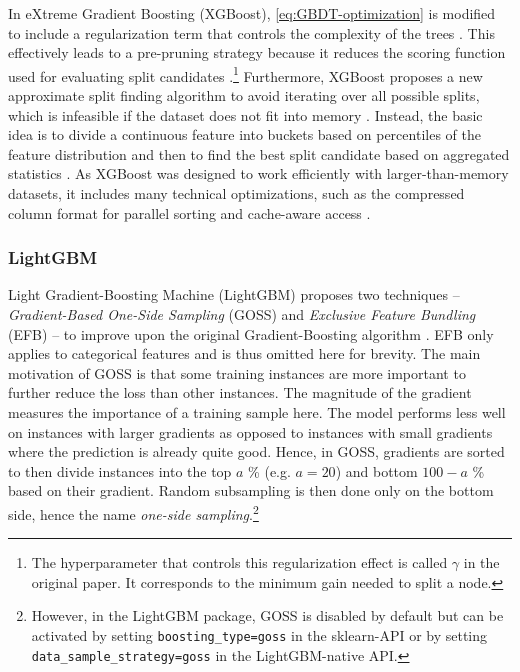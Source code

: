 In eXtreme Gradient Boosting (XGBoost), \cref{eq:GBDT-optimization} is modified to include a regularization term that controls the complexity of the trees \parencite[2]{chen_xgboost_2016}. This effectively leads to a pre-pruning strategy because it reduces the scoring function used for evaluating split candidates \parencites[1941--1942]{bentejac_comparative_2021}.\footnote{The hyperparameter that controls this regularization effect is called $\gamma$ in the original paper. It corresponds to the minimum gain needed to split a node.}
Furthermore, XGBoost proposes a new approximate split finding algorithm to avoid iterating over all possible splits, which is infeasible if the dataset does not fit into memory \parencite[Chapter~3]{chen_xgboost_2016}. Instead, the basic idea is to divide a continuous feature into buckets based on percentiles of the feature distribution and then to find the best split candidate based on aggregated statistics \parencite[Chapter~3.2]{chen_xgboost_2016}.
As XGBoost was designed to work efficiently with larger-than-memory datasets, it includes many technical optimizations, such as the compressed column format for parallel sorting and cache-aware access \parencite[Chapter~4]{chen_xgboost_2016}.

\subsubsection{LightGBM}

Light Gradient-Boosting Machine (LightGBM) proposes two techniques -- \textit{Gradient-Based One-Side Sampling} (GOSS) and \textit{Exclusive Feature Bundling} (EFB) -- to improve upon the original Gradient-Boosting algorithm \parencite[1]{ke_lightgbm_2017}. EFB only applies to categorical features and is thus omitted here for brevity. The main motivation of GOSS is that some training instances are more important to further reduce the loss than other instances. The magnitude of the gradient measures the importance of a training sample here. The model performs less well on instances with larger gradients as opposed to instances with small gradients where the prediction is already quite good. Hence, in GOSS, gradients are sorted to then divide instances into the top $a$ \% (e.g. $a=20$) and bottom $100 - a$ \% based on their gradient. Random subsampling is then done only on the bottom side, hence the name \textit{one-side sampling}.\footnote{However, in the LightGBM package, GOSS is disabled by default but can be activated by setting \texttt{boosting\_type=goss} in the sklearn-API or by setting \texttt{data\_sample\_strategy=goss} in the LightGBM-native API.}

